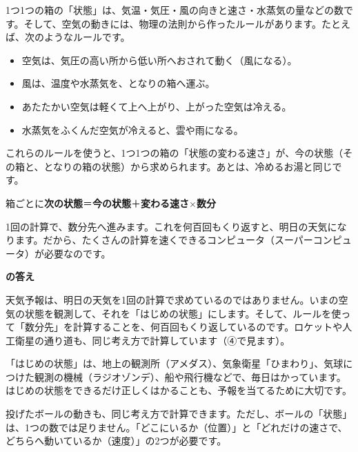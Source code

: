 1つ1つの箱の「状態」は、気温・気圧・風の向きと速さ・水蒸気の量などの数です。そして、空気の動きには、物理の法則から作ったルールがあります。たとえば、次のようなルールです。
\begin{itemize}[leftmargin=1.2\zw, itemsep=1pt, topsep=2pt, label={\color{\bkTT}●}]
\item 空気は、気圧の高い所から低い所へおされて動く（風になる）。
\item 風は、温度や水蒸気を、となりの箱へ運ぶ。
\item あたたかい空気は軽くて上へ上がり、上がった空気は冷える。
\item 水蒸気をふくんだ空気が冷えると、雲や雨になる。
\end{itemize}
これらのルールを使うと、1つ1つの箱の「状態の変わる速さ」が、今の状態（その箱と、となりの箱の状態）から求められます。あとは、冷めるお湯と同じです。

\begin{taisetsu}
\centering 箱ごとに\enspace\textbf{次の状態}\enspace ＝\enspace\textbf{今の状態}\enspace ＋\enspace\textbf{変わる速さ}\enspace ×\enspace\textbf{数分}
\end{taisetsu}

1回の計算で、数分先へ進みます。これを何百回もくり返すと、明日の天気になります。だから、たくさんの計算を速くできるコンピュータ（スーパーコンピュータ）が必要なのです。

\noindent\textbf{\bkhatenaref の答え}\par
天気予報は、明日の天気を1回の計算で求めているのではありません。いまの空気の状態を観測して、それを「はじめの状態」にします。そして、ルールを使って「数分先」を計算することを、何百回もくり返しているのです。ロケットや人工衛星の通り道も、同じ考え方で計算しています（④で見ます）。

「はじめの状態」は、地上の観測所（アメダス）、気象衛星「ひまわり」、気球につけた観測の機械（ラジオゾンデ）、船や飛行機などで、毎日はかっています。はじめの状態をできるだけ正しくはかることも、予報を当てるために大切です。




\label{bk:6-0:ball}投げたボールの動きも、同じ考え方で計算できます。ただし、ボールの「状態」は、1つの数では足りません。「どこにいるか（位置）」と「どれだけの速さで、どちらへ動いているか（速度）」の2つが必要です。

